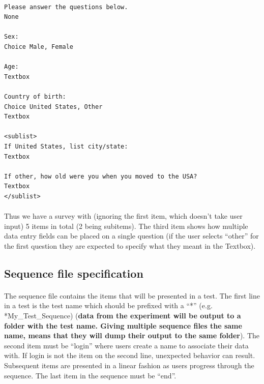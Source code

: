 \documentclass[12pt, oneside]{scrbook}   	%
\begin{document}
\paragraph{}

\begin{tcolorbox}[breakable,colback=white,colframe=blue,width=\dimexpr\textwidth+12mm\relax,enlarge left by=-6mm,enlarge right by=6mm]

\begin{lstlisting}
Please answer the questions below.
None

Sex: 
Choice Male, Female

Age:
Textbox

Country of birth:
Choice United States, Other
Textbox

<sublist>
If United States, list city/state:
Textbox

If other, how old were you when you moved to the USA?
Textbox
</sublist>

\end{lstlisting}

\end{tcolorbox}

\paragraph{}
Thus we have a survey with (ignoring the first item, which doesn't take user input) 5 items in total (2 being subitems).  The third item shows how multiple data entry fields can be placed on a single question (if the user selects ``other'' for the first question they are expected to specify what they meant in the Textbox).

\subsection{Sequence file specification}
\label{sec:sequenceSpec}

\paragraph{}
The sequence file contains the items that will be presented in a test.  The first line in a test is the test name which should be prefixed with a ``*'' (e.g. *My\_Test\_Sequence) (\textbf{data from the experiment will be output to a folder with the test name.  Giving multiple sequence files the same name, means that they will dump their output to the same folder}).  The second item must be ``login'' where users create a name to associate their data with.  If login is not the item on the second line, unexpected behavior can result.
Subsequent items are presented in a linear fashion as users progress through the sequence.  The last item in the sequence must be ``end''.
\end{document}
